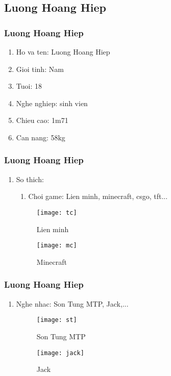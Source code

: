 \documentclass[12pt]{beamer}
\begin{document}
\subsection{Luong Hoang Hiep}
\begin{frame}
\frametitle{Luong Hoang Hiep}
\begin{enumerate}[1]
\item Ho va ten: Luong Hoang Hiep
\item Gioi tinh: Nam
\item Tuoi: 18
\item Nghe nghiep: sinh vien 
\item Chieu cao: 1m71
\item Can nang: 58kg
\end{enumerate}
\end{frame}
\begin{frame}
\frametitle{Luong Hoang Hiep}
\begin{enumerate}[8]
\item So thich:
\begin{enumerate}[+]
\item Choi game: Lien minh, minecraft, csgo, tft...
\end{enumerate}
\begin{figure}
\begin{minipage}{0.4\textwidth}\centerline{\texttt{[image: tc]}}
\caption{Lien minh}
\end{minipage}
\begin{minipage}{0.5\textwidth}\centerline{\texttt{[image: mc]}}
\caption{Minecraft}
\end{minipage}
\end{figure}

\end{enumerate}
\end{frame}
\begin{frame}
\frametitle{Luong Hoang Hiep}
\begin{enumerate}[+]
\item Nghe nhac: Son Tung MTP, Jack,...
\begin{figure}
\begin{minipage}{0.4\textwidth}\centerline{\texttt{[image: st]}}
\caption{Son Tung MTP}
\end{minipage}
\begin{minipage}{0.5\textwidth}\centerline{\texttt{[image: jack]}}
\caption{Jack}
\end{minipage}
\end{figure}

\end{enumerate}
\end{frame}
\end{document}
